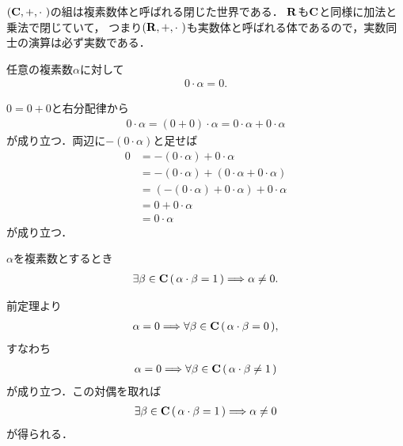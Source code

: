 	$(\C,+,\cdot\ )$の組は複素数体と呼ばれる閉じた世界である．
	$\mathbf{R}$も$\mathbf{C}$と同様に加法と乗法で閉じていて，
	つまり$(\R,+,\cdot\ )$も実数体と呼ばれる体であるので，実数同士の演算は必ず実数である．
	
	\begin{screen}
		\begin{thm}[$0$は乗法に関して逆元を持たない]
			任意の複素数$\alpha$に対して
			\begin{align}
				0 \cdot \alpha = 0.
			\end{align}
		\end{thm}
	\end{screen}
	
	\begin{sketch}
		$0 = 0+0$と右分配律から
		\begin{align}
			0 \cdot \alpha = (0+0) \cdot \alpha
			= 0 \cdot \alpha + 0 \cdot \alpha
		\end{align}
		が成り立つ．両辺に$-(0 \cdot \alpha)$と足せば
		\begin{align}
			0 &= -(0 \cdot \alpha) + 0 \cdot \alpha \\
			&= -(0 \cdot \alpha) + (0 \cdot \alpha + 0 \cdot \alpha) \\
			&= (-(0 \cdot \alpha) + 0 \cdot \alpha) + 0 \cdot \alpha \\
			&= 0 + 0 \cdot \alpha \\
			&= 0 \cdot \alpha
		\end{align}
		が成り立つ．
		\QED
	\end{sketch}
	
	\begin{screen}
		\begin{thm}
		\label{thm:if_has_inverse_wrt_multiplication_then_not_zero}
			$\alpha$を複素数とするとき
			\begin{align}
				\exists \beta \in \mathbf{C}\, (\, \alpha \cdot \beta = 1\, )
				\Longrightarrow \alpha \neq 0.
			\end{align}
		\end{thm}
	\end{screen}
	
	\begin{sketch}
		前定理より
		\begin{align}
			\alpha = 0 \Longrightarrow \forall \beta \in \mathbf{C}\, (\, \alpha \cdot \beta = 0\, ),
		\end{align}
		すなわち
		\begin{align}
			\alpha = 0 \Longrightarrow \forall \beta \in \mathbf{C}\, (\, \alpha \cdot \beta \neq 1\, )
		\end{align}
		が成り立つ．この対偶を取れば
		\begin{align}
			\exists \beta \in \mathbf{C}\, (\, \alpha \cdot \beta = 1\, )
			\Longrightarrow \alpha \neq 0
		\end{align}
		が得られる．
		\QED
	\end{sketch}
	
